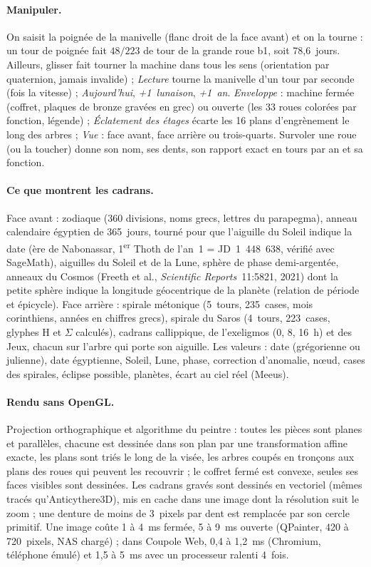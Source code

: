 \paragraph{Manipuler.} On saisit la poignée de la manivelle (flanc droit de la face avant) et on la tourne : un tour de
poignée fait $48/223$ de tour de la grande roue b1, soit 78,6~jours. Ailleurs, glisser fait tourner la machine dans tous
les sens (orientation par quaternion, jamais invalide) ; \emph{Lecture} tourne la manivelle d'un tour par seconde
(fois la vitesse) ; \emph{Aujourd'hui}, \emph{+1~lunaison}, \emph{+1~an}. \emph{Enveloppe} : machine fermée (coffret,
plaques de bronze gravées en grec) ou ouverte (les 33 roues colorées par fonction, légende) ; \emph{Éclatement des
étages} écarte les 16 plans d'engrènement le long des arbres ; \emph{Vue} : face avant, face arrière ou trois-quarts.
Survoler une roue (ou la toucher) donne son nom, ses dents, son rapport exact en tours par an et sa fonction.

\paragraph{Ce que montrent les cadrans.} Face avant : zodiaque (360 divisions, noms grecs, lettres du parapegma),
anneau calendaire égyptien de 365~jours, tourné pour que l'aiguille du Soleil indique la date (ère de Nabonassar,
1\textsuperscript{er} Thoth de l'an~1 = JD~1~448~638, vérifié avec SageMath), aiguilles du Soleil et de la Lune, sphère
de phase demi-argentée, anneaux du Cosmos (Freeth et al., \emph{Scientific Reports}~11:5821, 2021) dont la petite sphère
indique la longitude géocentrique de la planète (relation de période et épicycle). Face arrière : spirale métonique
(5~tours, 235~cases, mois corinthiens, années en chiffres grecs), spirale du Saros (4~tours, 223~cases, glyphes
$\mathrm{H}$ et $\Sigma$ calculés), cadrans callippique, de l'exeligmos (0, 8, 16~h) et des Jeux, chacun sur l'arbre qui porte son
aiguille. Les valeurs : date (grégorienne ou julienne), date égyptienne, Soleil, Lune, phase, correction d'anomalie,
nœud, cases des spirales, éclipse possible, planètes, écart au ciel réel (Meeus).

\paragraph{Rendu sans OpenGL.} Projection orthographique et algorithme du peintre : toutes les pièces sont planes et
parallèles, chacune est dessinée dans son plan par une transformation affine exacte, les plans sont triés le long de
la visée, les arbres coupés en tronçons aux plans des roues qui peuvent les recouvrir ; le coffret fermé est convexe,
seules ses faces visibles sont dessinées. Les cadrans gravés sont dessinés en vectoriel (mêmes tracés
qu'Anticythere3D), mis en cache dans une image dont la résolution suit le zoom ; une denture de moins de 3~pixels par
dent est remplacée par son cercle primitif. Une image coûte 1 à 4~ms fermée, 5 à 9~ms ouverte (QPainter, 420 à
720~pixels, NAS chargé) ; dans Coupole Web, 0,4 à 1,2~ms (Chromium, téléphone émulé) et 1,5 à 5~ms avec un processeur
ralenti 4~fois.

